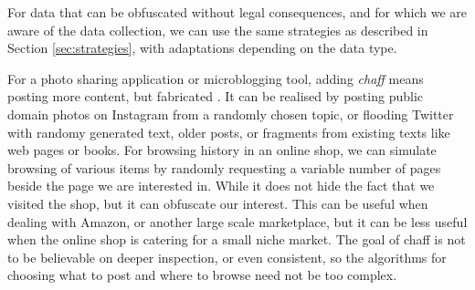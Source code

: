 \documentclass{IOS-Book-Article}     %
\newcommand{\tbox}[3][red]{{
\color{#1}\noindent{
   \fbox{\scriptsize{ {\bf #2} \textsl{#3}}}
   \vspace{2pt}
}
}}
\newcommand{\todo}[1]{\tbox{TODO:}{#1}}
\begin{document}
For data that can be obfuscated without legal consequences, and for 
which we are aware of the data collection, we can use the same 
strategies as described in Section \ref{sec:strategies}, with adaptations 
depending on the data type. 

For a photo sharing application or microblogging tool, adding \emph{chaff} 
means posting more content, but fabricated \todo{the q is do we want to?}. It 
can be realised by posting public domain photos on Instagram from a randomly 
chosen topic, or flooding Twitter with randomy generated text, older posts, or 
fragments from existing texts like web pages or books. For browsing history in 
an online shop, we can simulate browsing of various items by randomly requesting 
a variable number of pages beside the page we are interested in. While it does 
not hide the fact that we visited the shop, but it can obfuscate our interest. 
This can be useful when dealing with Amazon, or another large scale marketplace, 
but it can be less useful when the online shop is catering for a small niche 
market. 
The goal of chaff is not to be believable on deeper inspection, or even 
consistent, so the algorithms for choosing what to post and where to browse 
need not be too complex. 
\end{document}
